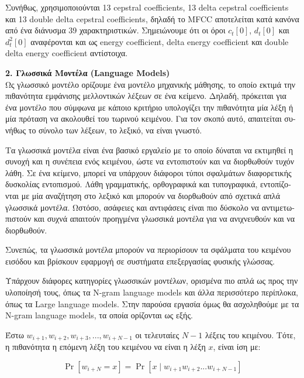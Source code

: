 \documentclass[a4paper,11pt]{article}
\begin{document}
\textgreek{Συνήθως, χρησιμοποιούνται 13 }cepstral coefficients, 13  delta cepstral coefficients \textgreek{και }13 double delta cepstral coefficients, \textgreek{δηλαδή το }MFCC \textgreek{αποτελείται κατά κανόνα από ένα διάνυσμα 39 χαρακτηριστικών. Σημειώνουμε ότι οι όροι }$c_t[0]$, $d_t[0]$ \textgreek{και} $d_{t}^2[0]$ \textgreek{αναφέρονται και ως} energy coefficient, delta energy coefficient \textgreek{και} double delta energy coefficient \textgreek{αντίστοιχα.}

\textbf{2. Γλωσσικά Μοντέλα (Language Models)}\\

\textgreek{Ως γλωσσικό μοντέλο ορίζουμε ένα μοντέλο μηχανικής μάθησης, το οποίο εκτιμά την πιθανότητα εμφάνισης μελλοντικών λέξεων σε ένα κείμενο. Δηλαδή, πρόκειται για ένα μοντέλο που σύμφωνα με κάποιο κριτήριο υπολογίζει την πιθανότητα μία λέξη ή μία πρόταση να ακολουθεί του τωρινού κειμένου. Για τον σκοπό αυτό, απαιτείται συνήθως το σύνολο των λέξεων, το λεξικό, να είναι γνωστό.}

\textgreek{Τα γλωσσικά μοντέλα είναι ένα βασικό εργαλείο με το οποίο δύναται να εκτιμηθεί η συνοχή και η συνέπεια ενός κειμένου, ώστε να εντοπιστούν και να διορθωθούν τυχόν λάθη. Σε ένα κείμενο, μπορεί να υπάρχουν διάφοροι τύποι σφαλμάτων διαφορετικής δυσκολίας εντοπισμού. Λάθη γραμματικής, ορθογραφικά και τυπογραφικά, εντοπίζονται με μία αναζήτηση στο λεξικό και μπορούν να διορθωθούν από σχετικά απλά γλωσσικά μοντέλα. Ωστόσο, ασάφειες και αντιφάσεις είναι πιο δύσκολο να αντιμετωπιστούν και συχνά απαιτούν προηγμένα γλωσσικά μοντέλα για να ανιχνευθούν και να διορθωθούν.}

\textgreek{Συνεπώς, τα γλωσσικά μοντέλα μπορούν να περιορίσουν τα σφάλματα του κειμένου εισόδου και βρίσκουν εφαρμογή σε συστήματα επεξεργασίας φυσικής γλώσσας.}

\textgreek{Υπάρχουν διάφορες κατηγορίες γλωσσικών μοντέλων, ορισμένα πιο απλά ως προς την υλοποίησή τους, όπως τα }N-gram language models \textgreek{ και άλλα περισσότερο περίπλοκα, όπως τα }Large language models. \textgreek{Στην παρούσα εργασία όμως θα ασχοληθούμε με τα} N-gram language models, \textgreek{τα οποία ορίζονται ως εξής.}

\textgreek{Έστω }$w_{i+1}, w_{i+2}, w_{i+3}, ..., w_{i+N-1}$ \textgreek{οι τελευταίες }$N-1$ \textgreek{ λέξεις του κειμένου. Τότε, η πιθανότητα η επόμενη λέξη του κειμένου να είναι η λέξη }$x$, \textgreek{είναι ίση με:}

\[\Pr[w_{i+N}=x]=\Pr[x \mid w_{i+1}w_{i+2}...w_{i+N-1}]\]
\end{document}
